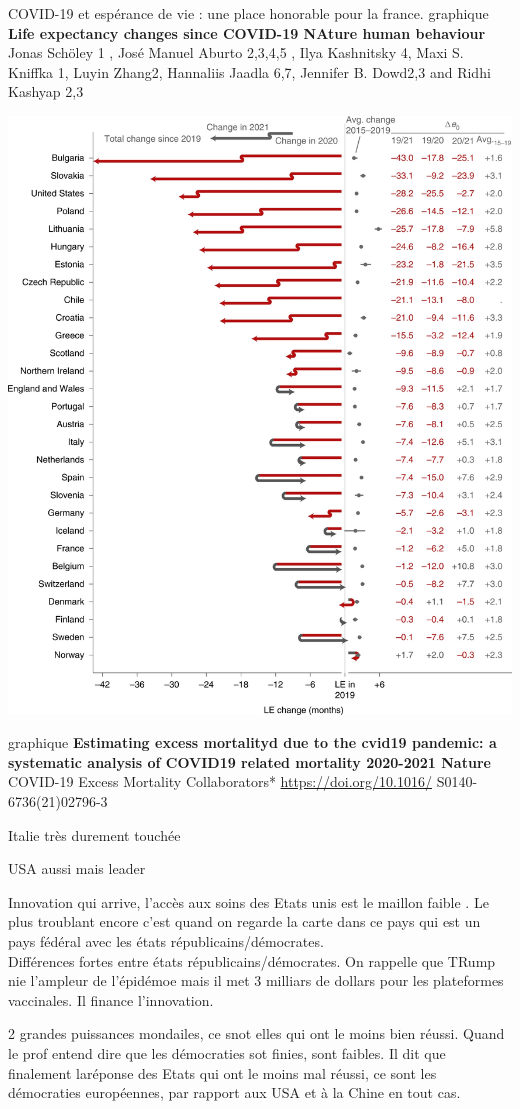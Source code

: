 \documentclass[
  ignorenonframetext,
]{beamer}
\begin{document}
\begin{frame}{COVID-19 et espérance de vie : une place honorable pour la
france.}
\protect\hypertarget{covid-19-et-espuxe9rance-de-vie-une-place-honorable-pour-la-france.}{}
graphique \textbf{Life expectancy changes since COVID-19 NAture human
behaviour} Jonas Schöley 1 , José Manuel Aburto 2,3,4,5 , Ilya
Kashnitsky 4, Maxi S. Kniffka 1, Luyin Zhang2, Hannaliis Jaadla 6,7,
Jennifer B. Dowd2,3 and Ridhi Kashyap 2,3

\includegraphics{images/clipboard-211497635.png}

graphique \textbf{Estimating excess mortalityd due to the cvid19
pandemic: a systematic analysis of COVID19 related mortality 2020-2021
Nature} COVID-19 Excess Mortality Collaborators*
\url{https://doi.org/10.1016/} S0140-6736(21)02796-3

Italie très durement touchée

USA aussi mais leader

Innovation qui arrive, l'accès aux soins des Etats unis est le maillon
faible . Le plus troublant encore c'est quand on regarde la carte dans
ce pays qui est un pays fédéral avec les états
républicains/démocrates.\\
Différences fortes entre états républicains/démocrates. On rappelle que
TRump nie l'ampleur de l'épidémoe mais il met 3 milliars de dollars pour
les plateformes vaccinales. Il finance l'innovation.

2 grandes puissances mondailes, ce snot elles qui ont le moins bien
réussi. Quand le prof entend dire que les démocraties sot finies, sont
faibles. Il dit que finalement laréponse des Etats qui ont le moins mal
réussi, ce sont les démocraties européennes, par rapport aux USA et à la
Chine en tout cas.
\end{frame}
\end{document}
